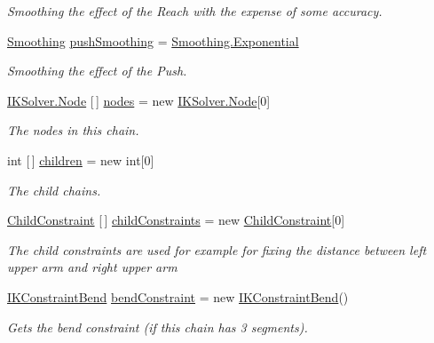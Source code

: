 \begin{DoxyCompactItemize}
\begin{DoxyCompactList}\small\item\em Smoothing the effect of the Reach with the expense of some accuracy. \end{DoxyCompactList}\item 
\mbox{\hyperlink{class_root_motion_1_1_final_i_k_1_1_f_b_i_k_chain_a2c75de88180a5922368eaa4c4efb3ac9}{Smoothing}} \mbox{\hyperlink{class_root_motion_1_1_final_i_k_1_1_f_b_i_k_chain_ac0061137bbb24205fa83bf51a047374f}{push\+Smoothing}} = \mbox{\hyperlink{class_root_motion_1_1_final_i_k_1_1_f_b_i_k_chain_a2c75de88180a5922368eaa4c4efb3ac9ac1e19c09f700938f0ff7f1fd4722a3ac}{Smoothing.\+Exponential}}
\begin{DoxyCompactList}\small\item\em Smoothing the effect of the Push. \end{DoxyCompactList}\item 
\mbox{\hyperlink{class_root_motion_1_1_final_i_k_1_1_i_k_solver_1_1_node}{I\+K\+Solver.\+Node}} \mbox{[}$\,$\mbox{]} \mbox{\hyperlink{class_root_motion_1_1_final_i_k_1_1_f_b_i_k_chain_ab19a69e9c38ffec272cba41030cfbb40}{nodes}} = new \mbox{\hyperlink{class_root_motion_1_1_final_i_k_1_1_i_k_solver_1_1_node}{I\+K\+Solver.\+Node}}\mbox{[}0\mbox{]}
\begin{DoxyCompactList}\small\item\em The nodes in this chain. \end{DoxyCompactList}\item 
int \mbox{[}$\,$\mbox{]} \mbox{\hyperlink{class_root_motion_1_1_final_i_k_1_1_f_b_i_k_chain_a0cc59ce9014a189e49f332a963b912b9}{children}} = new int\mbox{[}0\mbox{]}
\begin{DoxyCompactList}\small\item\em The child chains. \end{DoxyCompactList}\item 
\mbox{\hyperlink{class_root_motion_1_1_final_i_k_1_1_f_b_i_k_chain_1_1_child_constraint}{Child\+Constraint}} \mbox{[}$\,$\mbox{]} \mbox{\hyperlink{class_root_motion_1_1_final_i_k_1_1_f_b_i_k_chain_ac7a843d4a4b2cd31b37afadc399ade6a}{child\+Constraints}} = new \mbox{\hyperlink{class_root_motion_1_1_final_i_k_1_1_f_b_i_k_chain_1_1_child_constraint}{Child\+Constraint}}\mbox{[}0\mbox{]}
\begin{DoxyCompactList}\small\item\em The child constraints are used for example for fixing the distance between left upper arm and right upper arm \end{DoxyCompactList}\item 
\mbox{\hyperlink{class_root_motion_1_1_final_i_k_1_1_i_k_constraint_bend}{I\+K\+Constraint\+Bend}} \mbox{\hyperlink{class_root_motion_1_1_final_i_k_1_1_f_b_i_k_chain_a9da22043dfd81c60bb9d3e8b7a7d6e8a}{bend\+Constraint}} = new \mbox{\hyperlink{class_root_motion_1_1_final_i_k_1_1_i_k_constraint_bend}{I\+K\+Constraint\+Bend}}()
\begin{DoxyCompactList}\small\item\em Gets the bend constraint (if this chain has 3 segments). \end{DoxyCompactList}\end{DoxyCompactItemize}
